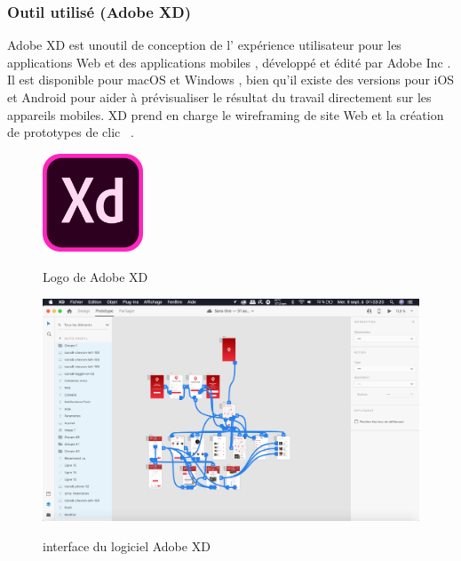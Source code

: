 \subsubsection{Outil utilisé (Adobe XD)}
Adobe XD est unoutil de conception de l' expérience utilisateur pour les applications Web et des applications mobiles , développé et édité par Adobe Inc . Il est disponible pour macOS et Windows , bien qu'il existe des versions pour iOS et Android pour aider à prévisualiser le résultat du travail directement sur les appareils mobiles. XD prend en charge le wireframing de site Web et la création de prototypes de clic ~\cite{AdobeXD2020}.
\begin{figure}[!h]

    \centering
    \includegraphics[width=3cm]{images/Chapitre3/AdobeXD.png}
    \label{fig:label6}
    \caption{Logo de Adobe XD}
\end{figure}
\begin{figure}[!h]

    \centering
    \includegraphics[width=6.5in]{images/Chapitre3/interface_adobe_xd.png}
    \label{fig:label6}
    \caption{interface du logiciel Adobe XD}
\end{figure}

\newpage
